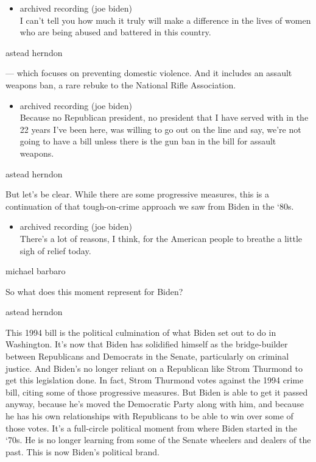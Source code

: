 \begin{itemize}
\tightlist
\item
  archived recording (joe biden)\\
  I can't tell you how much it truly will make a difference in the lives
  of women who are being abused and battered in this country.
\end{itemize}

astead herndon

--- which focuses on preventing domestic violence. And it includes an
assault weapons ban, a rare rebuke to the National Rifle Association.

\begin{itemize}
\tightlist
\item
  archived recording (joe biden)\\
  Because no Republican president, no president that I have served with
  in the 22 years I've been here, was willing to go out on the line and
  say, we're not going to have a bill unless there is the gun ban in the
  bill for assault weapons.
\end{itemize}

astead herndon

But let's be clear. While there are some progressive measures, this is a
continuation of that tough-on-crime approach we saw from Biden in the
`80s.

\begin{itemize}
\tightlist
\item
  archived recording (joe biden)\\
  There's a lot of reasons, I think, for the American people to breathe
  a little sigh of relief today.
\end{itemize}

michael barbaro

So what does this moment represent for Biden?

astead herndon

This 1994 bill is the political culmination of what Biden set out to do
in Washington. It's now that Biden has solidified himself as the
bridge-builder between Republicans and Democrats in the Senate,
particularly on criminal justice. And Biden's no longer reliant on a
Republican like Strom Thurmond to get this legislation done. In fact,
Strom Thurmond votes against the 1994 crime bill, citing some of those
progressive measures. But Biden is able to get it passed anyway, because
he's moved the Democratic Party along with him, and because he has his
own relationships with Republicans to be able to win over some of those
votes. It's a full-circle political moment from where Biden started in
the `70s. He is no longer learning from some of the Senate wheelers and
dealers of the past. This is now Biden's political brand.

